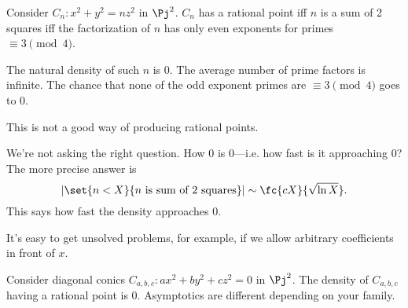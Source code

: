 \begin{ex}[Circles]
Consider $C_n:x^2+y^2=nz^2$ in $\Pj^2$. $C_n$ has a rational point iff $n$ is a sum of 2 squares iff the factorization of $n$ has only even exponents for primes $\equiv 3\pmod 4$. 

The natural density of such $n$ is 0. The average number of prime factors is infinite. The chance that none of the odd exponent primes are $\equiv 3\pmod 4$ goes to 0. 

This is not a good way of producing rational points. 
\end{ex}
We're not asking the right question. How 0 is 0---i.e. how fast is it approaching 0? The more precise answer is
\[
|\set{n<X}{n\text{ is sum of 2 squares}}|\sim\fc{cX}{\sqrt{\ln X}}.
\]
This says how fast the density approaches 0.

It's easy to get unsolved problems, for example, if we allow arbitrary coefficients in front of $x$.
\begin{ex}
Consider diagonal conics $C_{a,b,c}: ax^2+by^2+cz^2=0$ in $\Pj^2$. The density of $C_{a,b,c}$ having a rational point is 0. Asymptotics are different depending on your family.
\end{ex}

